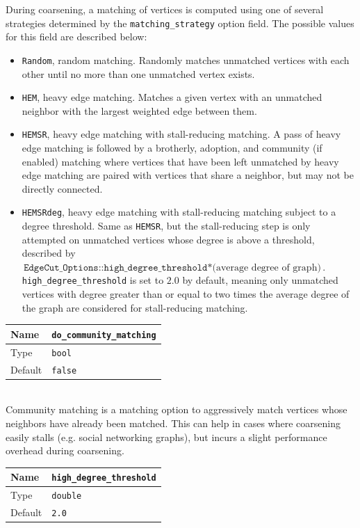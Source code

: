 \documentclass[letter]{article}
\begin{document}
During coarsening, a matching of vertices is computed using one of several strategies determined by the \texttt{matching\_strategy} option field. The possible values for this field are described below:

\begin{itemize}
\item \texttt{Random}, random matching. Randomly matches unmatched vertices with each other until no more than one unmatched vertex exists.
\item \texttt{HEM}, heavy edge matching. Matches a given vertex with an unmatched neighbor with the largest weighted edge between them.
\item \texttt{HEMSR}, heavy edge matching with stall-reducing matching. A pass of heavy edge matching is followed by a brotherly, adoption, and community (if enabled) matching where vertices that have been left unmatched by heavy edge matching are paired with vertices that share a neighbor, but may not be directly connected.
\item \texttt{HEMSRdeg}, heavy edge matching with stall-reducing matching subject to a degree threshold. Same as \texttt{HEMSR}, but the stall-reducing step is only attempted on unmatched vertices whose degree is above a threshold, described by $\texttt{EdgeCut\_Options::high\_degree\_threshold}*\text{(average degree of graph)}$. \texttt{high\_degree\_threshold} is set to $2.0$ by default, meaning only unmatched vertices with degree greater than or equal to two times the average degree of the graph are considered for stall-reducing matching.
\end{itemize}

\baselineskip
\begin{tabular}{|l|l|} \hline
Name & \texttt{do\_community\_matching} \\ \hline
Type & \texttt{bool} \\ \hline
Default & \texttt{false} \\ \hline
\end{tabular}\\

Community matching is a matching option to aggressively match vertices whose neighbors have already been matched. This can help in cases where coarsening easily stalls (e.g. social networking graphs), but incurs a slight performance overhead during coarsening.

\baselineskip
\begin{tabular}{|l|l|} \hline
Name & \texttt{high\_degree\_threshold} \\ \hline
Type & \texttt{double} \\ \hline
Default & \texttt{2.0} \\ \hline
\end{tabular}\\
\end{document}

